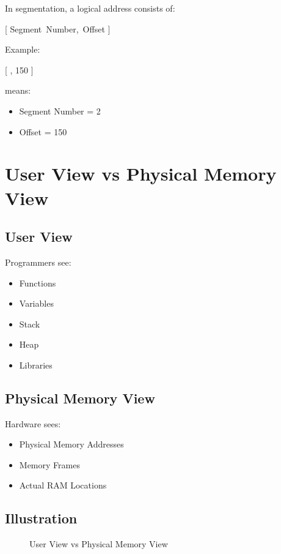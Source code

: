 In segmentation, a logical address consists of:

[
\langle Segment\ Number,\ Offset \rangle
]

Example:

[
, 150 \rangle
]

means:

\begin{itemize}
\item Segment Number = 2
\item Offset = 150
\end{itemize}

\section{User View vs Physical Memory View}

\subsection{User View}

Programmers see:

\begin{itemize}
\item Functions
\item Variables
\item Stack
\item Heap
\item Libraries
\end{itemize}

\subsection{Physical Memory View}

Hardware sees:

\begin{itemize}
\item Physical Memory Addresses
\item Memory Frames
\item Actual RAM Locations
\end{itemize}

\subsection{Illustration}

\begin{figure}[h]
\centering
{}
\caption{User View vs Physical Memory View}
\end{figure}

